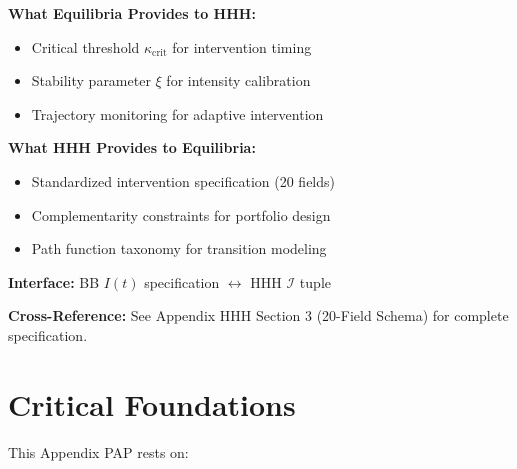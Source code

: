 \documentclass[11pt, a4paper]{article}
\begin{document}
\begin{tcolorbox}[colback=orange!5!white, colframe=orange!75!black,
    title=\textbf{Integration: Equilibria $\leftrightarrow$ HHH (Intervention Toolkit)}]
\textbf{What Equilibria Provides to HHH:}
\begin{itemize}[nosep]
\item Critical threshold $\kappa_{\text{crit}}$ for intervention timing
\item Stability parameter $\xi$ for intensity calibration
\item Trajectory monitoring for adaptive intervention
\end{itemize}

\textbf{What HHH Provides to Equilibria:}
\begin{itemize}[nosep]
\item Standardized intervention specification (20 fields)
\item Complementarity constraints for portfolio design
\item Path function taxonomy for transition modeling
\end{itemize}

\textbf{Interface:} BB $I(t)$ specification $\leftrightarrow$ HHH $\mathcal{I}$ tuple

\textbf{Cross-Reference:} See Appendix HHH Section 3 (20-Field Schema) for complete specification.

\end{tcolorbox}


\section{Critical Foundations}

This Appendix PAP rests on:
\end{document}
